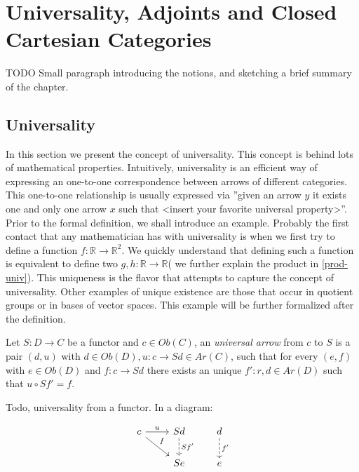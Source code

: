 
\chapter{Universality, Adjoints and Closed Cartesian Categories}
{\color{red} TODO} Small paragraph introducing the  notions, and sketching a brief summary of the chapter.

\section{Universality}
In this section we present the concept of universality. This concept is behind lots of mathematical properties. Intuitively, universality is an efficient way of expressing an one-to-one correspondence between arrows of different categories. This one-to-one relationship is usually expressed via ''given an arrow  $y$ it exists one and only one  arrow $x$ such that <insert your favorite universal property>''.\\

Prior to the formal definition, we shall introduce an example. Probably the first contact that any mathematician has with universality is when we first try to define a function  $f:\mathbb R \to \mathbb R^2$. We quickly understand that defining such a function is equivalent to define two $g,h: \mathbb R \to \mathbb R$( we further explain the product in \ref{prod-univ}). This uniqueness is the flavor that attempts to capture the concept of universality. Other examples of unique existence are those that occur in quotient groups or in bases of vector spaces.  This example will be further formalized after the definition.\\

\begin{definition}
  Let $S: D \to C$ be a functor and $c \in Ob(C)$, an \emph{universal arrow}  from $c$ to $S$ is a pair $(d,u)$ with $d\in Ob(D), u:c \to Sd \in Ar(C)$, such that for every $(e,f)$ with $e\in Ob(D)$  and $f:c\to Sd$ there exists an unique $f':r,d\in Ar(D)$ such that $u\circ Sf' = f$.

\end{definition}
{ Todo, universality from a functor.}
In a diagram:

\[
  \begin{tikzcd}
      c\arrow[r, "u"] \arrow[rd, "f"]      & Sd \arrow[d, "Sf'", dashed]& d\arrow[d,"f'", dashed]\\
       &Se& e 
    \end{tikzcd}
  \]

